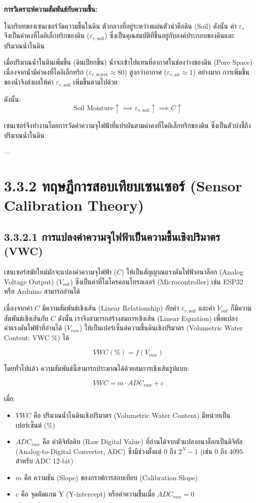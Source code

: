 \documentclass[11pt,a4paper,openany]{report}
\begin{document}
\textbf{การวิเคราะห์ความสัมพันธ์กับความชื้น:}

ในบริบทของเซนเซอร์วัดความชื้นในดิน ตัวกลางที่อยู่ระหว่างแผ่นตัวนำคือดิน (Soil) ดังนั้น ค่า $\varepsilon_r$ จึงเป็นค่าคงที่ไดอิเล็กทริกของดิน ($\varepsilon_{r, \text{soil}}$) ซึ่งเป็นคุณสมบัติที่ขึ้นอยู่กับองค์ประกอบของดินและปริมาณน้ำในดิน

เมื่อปริมาณน้ำในดินเพิ่มขึ้น (ดินเปียกขึ้น) น้ำจะเข้าไปแทนที่อากาศในช่องว่างของดิน (Pore Space) เนื่องจากน้ำมีค่าคงที่ไดอิเล็กทริก ($\varepsilon_{r, \text{water}} \approx 80$) สูงกว่าอากาศ ($\varepsilon_{r, \text{air}} \approx 1$) อย่างมาก การเพิ่มขึ้นของน้ำจึงส่งผลให้ค่า $\varepsilon_{r, \text{soil}}$ เพิ่มขึ้นตามไปด้วย

ดังนั้น:
$$\text{Soil Moisture} \uparrow \implies \varepsilon_{r, \text{soil}} \uparrow \implies C \uparrow$$


เซนเซอร์จึงทำงานโดยการวัดค่าความจุไฟฟ้าที่แปรผันตามค่าคงที่ไดอิเล็กทริกของดิน ซึ่งเป็นตัวบ่งชี้ถึงปริมาณน้ำในดิน

---

\section{3.3.2 ทฤษฎีการสอบเทียบเซนเซอร์ (Sensor Calibration Theory)}


\subsection{3.3.2.1 การแปลงค่าความจุไฟฟ้าเป็นความชื้นเชิงปริมาตร (VWC)}


เซนเซอร์สมัยใหม่มักจะแปลงค่าความจุไฟฟ้า ($C$) ให้เป็นสัญญาณแรงดันไฟฟ้าอนาล็อก (Analog Voltage Output) ($V_{out}$) ซึ่งเป็นค่าที่ไมโครคอนโทรลเลอร์ (Microcontroller) เช่น ESP32 หรือ Arduino สามารถอ่านได้

เนื่องจากค่า $C$ มีความสัมพันธ์เชิงเส้น (Linear Relationship) กับค่า $\varepsilon_{r, \text{soil}}$ และค่า $V_{out}$ ก็มีความสัมพันธ์เชิงเส้นกับ $C$ ดังนั้น เราจึงสามารถสร้างสมการเชิงเส้น (Linear Equation) เพื่อแปลงค่าแรงดันไฟฟ้าที่อ่านได้ ($V_{raw}$) ให้เป็นเปอร์เซ็นต์ความชื้นดินเชิงปริมาตร (Volumetric Water Content: VWC \%) ได้

$$VWC (\%) = f(V_{raw})$$


โดยทั่วไปแล้ว ความสัมพันธ์นี้สามารถประมาณได้ด้วยสมการเชิงเส้นรูปแบบ:

$$VWC = m \cdot ADC_{raw} + c$$


เมื่อ:
\begin{itemize}
  \item $VWC$ คือ ปริมาณน้ำในดินเชิงปริมาตร (Volumetric Water Content) มีหน่วยเป็นเปอร์เซ็นต์ ($\%$)
  \item $ADC_{raw}$ คือ ค่าดิจิทัลดิบ (Raw Digital Value) ที่อ่านได้จากตัวแปลงอนาล็อกเป็นดิจิทัล (Analog-to-Digital Converter, ADC) ซึ่งมีช่วงตั้งแต่ 0 ถึง $2^{N}-1$ (เช่น 0 ถึง 4095 สำหรับ ADC 12-bit)
  \item $m$ คือ ความชัน (Slope) ของกราฟการสอบเทียบ (Calibration Slope)
  \item $c$ คือ จุดตัดแกน Y (Y-intercept) หรือค่าความชื้นเมื่อ $ADC_{raw} = 0$
\end{itemize}
\end{document}
